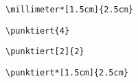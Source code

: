 \documentclass[]{arbeitsblatt}
\begin{document}



\begin{verbatim}
\millimeter*[1.5cm]{2.5cm}
\end{verbatim}

\millimeter*[1.5cm]{2.5cm}

\pagebreak

\begin{verbatim}
\punktiert{4}
\end{verbatim}




\begin{verbatim}
\punktiert[2]{2}
\end{verbatim}




\begin{verbatim}
\punktiert*[1.5cm]{2.5cm}
\end{verbatim}

\punktiert*[1.5cm]{2.5cm}
\end{document}
